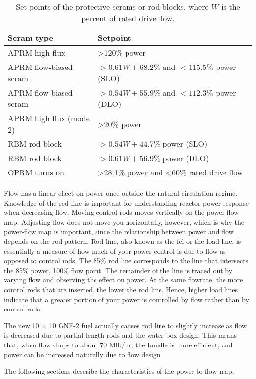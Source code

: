 \documentclass[10pt]{article}
\begin{document}
\begin{table}[h]
\caption{Set points of the protective scrams or rod blocks, where \(W\) is the percent of rated drive flow.}
\centering
\begin{tabular}{l l}
\hline\hline
Scram type & Setpoint\\ [0.5ex]
\hline
APRM high flux 				& \textgreater 120\% power\\
APRM flow-biased scram 	& \(> 0.61W+68.2\%\) and \(< 115.5\%\) power (SLO)\\
APRM flow-biased scram 	& \(> 0.54W+55.9\%\) and \(< 112.3\%\) power (DLO)\\
APRM high flux (mode 2)	& \textgreater 20\% power\\
RBM rod block					& \(> 0.54W+44.7\%\) power (SLO)\\
RBM rod block					& \(> 0.61W+56.9\%\) power (DLO)\\
OPRM turns on					& \textgreater 28.1\% power and \textless 60\% rated drive flow\\
\hline
\end{tabular}
\label{table:1}
\end{table}

Flow has a linear effect on power once outside the natural circulation regime. Knowledge of the rod line is important for understanding reactor power response when decreasing flow. Moving control rods moves vertically on the power-flow map. Adjusting flow does not move you horizontally, however, which is why the power-flow map is important, since the relationship between power and flow depends on the rod pattern. Rod line, also known as the \gls{fcl} or the load line, is essentially a measure of how much of your power control is due to flow as opposed to control rods. The 85\% rod line corresponds to the line that intersects the 85\% power, 100\% flow point. The remainder of the line is traced out by varying flow and observing the effect on power. At the same flowrate, the more control rods that are inserted, the lower the rod line. Hence, higher load lines indicate that a greater portion of your power is controlled by flow rather than by control rods. 

The new 10 \(\times\) 10 GNF-2 fuel actually causes rod line to slightly increase as flow is decreased due to partial length rods and the water box design. This means that, when flow drops to about 70 Mlb/hr, the bundle is more efficient, and power can be increased naturally due to flow design. 

The following sections describe the characteristics of the power-to-flow map.
\end{document}

